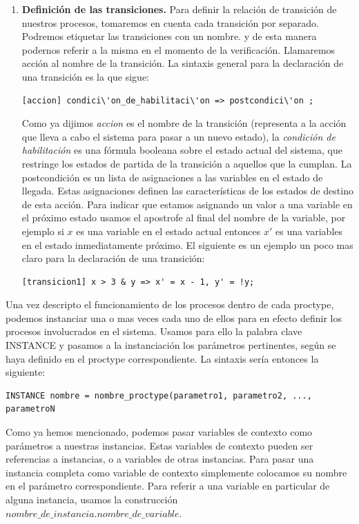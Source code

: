 \documentclass[titlepage, 12pt]{book}
\begin{document}
\begin{enumerate}
\item \textbf{Definici\'on de las transiciones.}
Para definir la relaci\'on de transici\'on de nuestros procesos, tomaremos en cuenta cada transici\'on por separado. Podremos etiquetar las transiciones con un nombre. y de esta manera podernos referir a la misma en el momento de la verificaci\'on. Llamaremos acci\'on al nombre de la transici\'on. La sintaxis general para la declaraci\'on de una transici\'on es la que sigue: \begin{verbatim}[accion] condici\'on_de_habilitaci\'on => postcondici\'on ;\end{verbatim}
Como ya dijimos \textit{accion} es el nombre de la transici\'on (representa a la acci\'on que lleva a cabo el sistema para pasar a un nuevo estado), la \textit{condici\'on de habilitaci\'on} es una f\'ormula booleana sobre el estado actual del sistema, que restringe los estados de partida de la transici\'on a aquellos que la cumplan. La postcondici\'on es un lista de asignaciones a las variables en el estado de llegada. Estas asignaciones definen las caracter\'isticas de los estados de destino de esta acci\'on. Para indicar que estamos asignando un valor a una variable en el pr\'oximo estado usamos el apostrofe al final del nombre de la variable, por ejemplo si $x$ es una variable en el estado actual entonces $x'$ es una variables en el estado inmediatamente pr\'oximo. El siguiente es un ejemplo un poco mas claro para la declaraci\'on de una transici\'on:\begin{verbatim}[transicion1] x > 3 & y => x' = x - 1, y' = !y;\end{verbatim}
\end{enumerate}

Una vez descripto el funcionamiento de los procesos dentro de cada proctype, podemos instanciar una o mas veces cada uno de ellos para en efecto definir los procesos involucrados en el sistema. Usamos para ello la palabra clave INSTANCE y pasamos a la instanciaci\'on los par\'ametros pertinentes, seg\'un se haya definido en el proctype correspondiente. La sintaxis ser\'ia entonces la siguiente: \begin{verbatim}INSTANCE nombre = nombre_proctype(parametro1, parametro2, ..., parametroN\end{verbatim}
Como ya hemos mencionado, podemos pasar variables de contexto como par\'ametros a nuestras instancias. Estas variables de contexto pueden ser referencias a instancias, o a variables de otras instancias. Para pasar una instancia completa como variable de contexto simplemente colocamos su nombre en el par\'ametro correspondiente. Para referir a una variable en particular de alguna instancia, usamos la construcci\'on $nombre\_de\_instancia.nombre\_de\_variable$.\\
\end{document}
